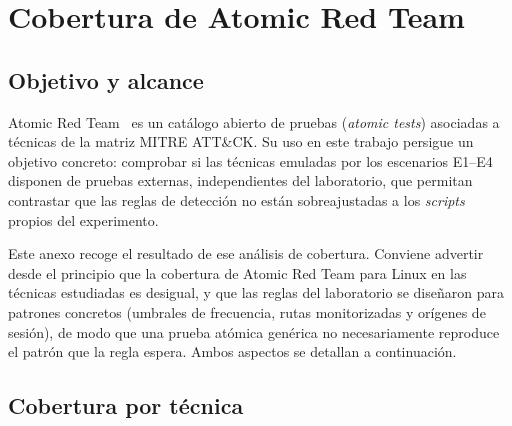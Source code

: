 \documentclass[../main.tex]{subfiles}
\begin{document}
\chapter{Cobertura de Atomic Red Team}
\label{anx:art}

\section{Objetivo y alcance}

Atomic Red Team~\cite{atomicredteam2024} es un catálogo abierto de pruebas
(\emph{atomic tests}) asociadas a técnicas de la matriz MITRE ATT\&CK. Su uso en
este trabajo persigue un objetivo concreto: comprobar si las técnicas emuladas por
los escenarios E1--E4 disponen de pruebas externas, independientes del laboratorio,
que permitan contrastar que las reglas de detección no están sobreajustadas a los
\emph{scripts} propios del experimento.

Este anexo recoge el resultado de ese análisis de cobertura. Conviene advertir
desde el principio que la cobertura de Atomic Red Team para Linux en las técnicas
estudiadas es desigual, y que las reglas del laboratorio se diseñaron para
patrones concretos (umbrales de frecuencia, rutas monitorizadas y orígenes de
sesión), de modo que una prueba atómica genérica no necesariamente reproduce el
patrón que la regla espera. Ambos aspectos se detallan a continuación.

\section{Cobertura por técnica}
\end{document}
